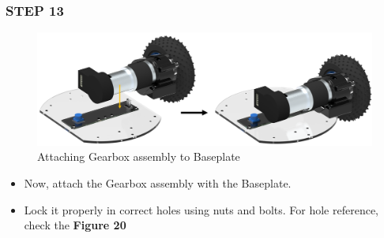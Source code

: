 \documentclass[12pt,a4paper,oneside]{book}
\begin{document}
			\subsubsection*{STEP 13}
				\begin{figure}[H]
					\begin{center}
						\includegraphics[scale=0.5]{ATTACHING GEARBOX ASSEMBLY TO BASEPLATE}
						\caption{Attaching Gearbox assembly to Baseplate}
					\end{center}
				\end{figure}
				\begin{itemize}
					\item Now, attach the Gearbox assembly with the Baseplate.
					\item Lock it properly in correct holes using nuts and bolts. For hole reference, check the \textbf{Figure 20}
				\end{itemize}
				
\end{document}
